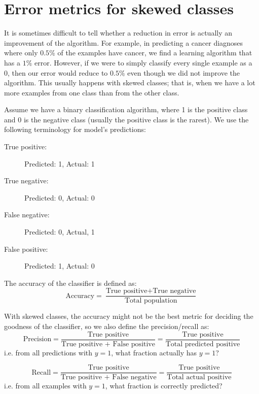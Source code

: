 \documentclass[a4paper,11pt]{report}
\begin{document}
\section{Error metrics for skewed classes}

It is sometimes difficult to tell whether a reduction in error is actually an improvement of the algorithm. For example, in predicting a cancer diagnoses where only $0.5\%$ of the examples have cancer, we find a learning algorithm that has a $1\%$ error. However, if we were to simply classify every single example as a 0, then our error would reduce to $0.5\%$ even though we did not improve the algorithm.
This usually happens with skewed classes; that is, when we have a lot more examples from one class than from the other class.

Assume we have a binary classification algorithm, where 1 is the positive class and 0 is the negative class (usually the positive class is the rarest). We use the following terminology for model's predictions: 
\begin{description}
  \item[True positive:] Predicted: 1, Actual: 1
  \item[True negative:] Predicted: 0, Actual: 0
  \item[False negative:] Predicted: 0, Actual, 1
  \item[False positive:] Predicted: 1, Actual: 0
\end{description}

The accuracy of the classifier is defined as:
\begin{equation}\label{df:accuracy}
\textrm{Accuracy} = \dfrac{\textrm{True positive} + \textrm{True negative}} {\textrm{Total population}}
\end{equation}

With skewed classes, the accuracy might not be the best metric for deciding the goodness of the classifier, so we also define the precision/recall as:
\begin{equation}\label{df:precision}
\textrm{Precision} = \dfrac{\textrm{True positive}}{\textrm{True positive + False positive}} = \dfrac{\textrm{True positive}}{\textrm{Total predicted positive}}
\end{equation}
i.e. from all predictions with $y=1$, what fraction actually has $y=1$?

\begin{equation}\label{df:recall}
\textrm{Recall} = \dfrac{\textrm{True positive}}{\textrm{True positive + False negative}} = \dfrac{\textrm{True positive}}{\textrm{Total actual positive}}
\end{equation}
i.e. from all examples with $y=1$, what fraction is correctly predicted?
\end{document}
